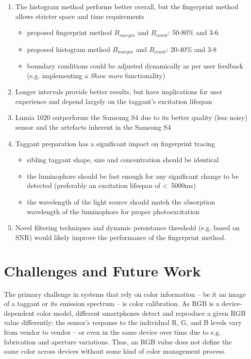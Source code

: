 \documentclass[thesis.tex]{subfiles}
\begin{document}
\begin{enumerate}
  \item The histogram method performs better overall, but the fingerprint method allows stricter space and time requirements
    \begin{itemize}
      \item proposed fingerprint method $B_{margin}$ and $B_{count}$: 50-80\% and 3-6
      \item proposed histogram method $B_{margin}$ and $B_{count}$: 20-40\% and 3-8
      \item boundary conditions could be adjusted dynamically as per user feedback (e.g. implementing a \emph{Show more} functionality)
    \end{itemize}
  \item Longer intervals provide better results, but have implications for user experience and depend largely on the taggant's excitation lifespan
  \item Lumia 1020 outperforms the Samsung S4 due to its better quality (less noisy) sensor and the artefacts inherent in the Samsung S4
  \item Taggant preparation has a significant impact on fingerprint tracing
    \begin{itemize}
      \item sibling taggant shape, size and concentration should be identical
      \item the luminophore should be fast enough for any significant change to be detected (preferably an excitation lifespan of \textless\ 5000ms)
      \item the wavelength of the light source should match the absorption wavelength of the luminophore for proper photoexcitation
    \end{itemize}
  \item Novel filtering techniques and dynamic persistance threshold (e.g. based on SNR) would likely improve the performance of the fingerprint method.
\end{enumerate}


\section{Challenges and Future Work}

The primary challenge in systems that rely on color information -- be it an image of a taggant or its emission spectrum -- is color calibration. As RGB is a device-dependent color model, different smartphones detect and reproduce a given RGB value differently: the sensor's response to the individual R, G, and B levels vary from vendor to vendor -- or even in the same device over time due to e.g. fabrication and aperture variations. Thus, an RGB value does not define the same color across devices without some kind of color management process.
\end{document}
